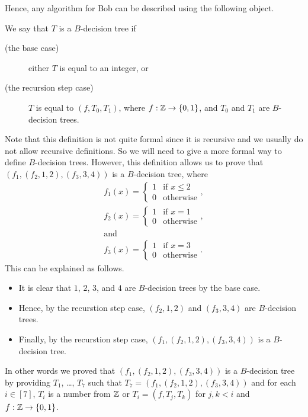 Hence, any algorithm for Bob can be described using the following object.
\begin{definition}
  We say that $T$ is a $B$-decision tree if
  \begin{description}
    \item [(the base case)] either $T$ is equal to an integer, or
    \item [(the recursion step case)] $T$ is equal to $(f, T_0, T_1)$,
      where $f : \Z \to \set{0, 1}$, and $T_0$ and $T_1$
      are $B$-decision trees.
  \end{description}
\end{definition}
Note that this definition is not quite formal since it is recursive and
we usually do not allow recursive definitions. So we will need to give a more
formal way to define $B$-decision trees. However, this definition allows us to
prove that $(f_1, (f_2, 1, 2), (f_3, 3, 4))$
is a $B$-decision tree, where
\begin{gather*}
  f_1(x) =
    \begin{cases}
      1 & \text{if } x \le 2 \\
      0 & \text{otherwise}
    \end{cases}, \\
  f_2(x) =
    \begin{cases}
      1 & \text{if } x = 1 \\
      0 & \text{otherwise}
    \end{cases}, \\
  \text{and} \\
  f_3(x) =
    \begin{cases}
      1 & \text{if } x = 3 \\
      0 & \text{otherwise}
    \end{cases}.
\end{gather*}
This can be explained as follows.
\begin{itemize}
  \item It is clear that $1$, $2$, $3$, and $4$ are $B$-decision trees by the
    base case.
  \item Hence, by the recurstion step case, $(f_2, 1, 2)$ and $(f_3, 3, 4)$
    are $B$-decision trees.
  \item Finally, by the recurstion step case, $(f_1, (f_2, 1, 2), (f_3, 3, 4))$
    is a $B$-decision tree.
\end{itemize}
In other words we proved that $(f_1, (f_2, 1, 2), (f_3, 3, 4))$
is a $B$-decision tree by providing $T_1$, \dots, $T_7$ such that
$T_7 = (f_1, (f_2, 1, 2), (f_3, 3, 4))$ and for each $i \in [7]$,
$T_i$ is a number from ${\mathbb{Z}}$ or $T_i = (f, T_j, T_k)$ for $j, k < i$ and
$f : \Z \to \set{0, 1}$.

